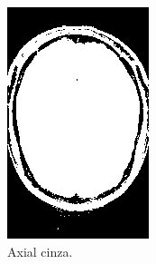 \documentclass{article}
\begin{document}
\begin{figure}[H]
\begin{subfigure}[b]{0.3\textwidth}
        \includegraphics[width=\textwidth]{brain/neuroradiologist-axial-gray.png}
        \caption{Axial cinza.}
    \end{subfigure}
    ~
    \begin{subfigure}[b]{0.3\textwidth}

\end{subfigure}
\end{figure}
\end{document}
